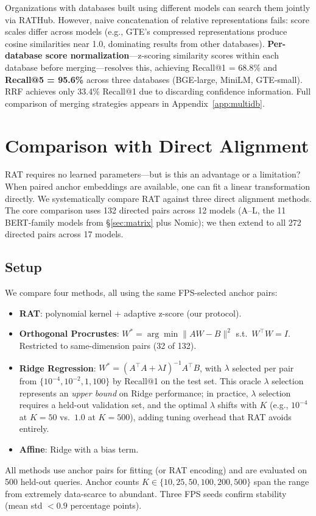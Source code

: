 \documentclass{article}
\begin{document}
Organizations with databases built using different models can search them jointly via RATHub. However, naive concatenation of relative representations fails: score scales differ across models (e.g., GTE's compressed representations produce cosine similarities near 1.0, dominating results from other databases). \textbf{Per-database score normalization}---z-scoring similarity scores within each database before merging---resolves this, achieving Recall@1 = 68.8\% and \textbf{Recall@5 = 95.6\%} across three databases (BGE-large, MiniLM, GTE-small). RRF achieves only 33.4\% Recall@1 due to discarding confidence information. Full comparison of merging strategies appears in Appendix~\ref{app:multidb}.

\section{Comparison with Direct Alignment}
\label{sec:alignment}

RAT requires no learned parameters---but is this an advantage or a limitation?  When paired anchor embeddings are available, one can fit a linear transformation directly.  We systematically compare RAT against three direct alignment methods.  The core comparison uses 132 directed pairs across 12 models (A--L, the 11 BERT-family models from \S\ref{sec:matrix} plus Nomic); we then extend to all 272 directed pairs across 17 models.

\subsection{Setup}

We compare four methods, all using the same FPS-selected anchor pairs:
\begin{itemize}
  \item \textbf{RAT}: polynomial kernel + adaptive z-score (our protocol).
  \item \textbf{Orthogonal Procrustes}: $W^* = \arg\min \|AW - B\|^2$ s.t.\ $W^\top W = I$. Restricted to same-dimension pairs (32 of 132).
  \item \textbf{Ridge Regression}: $W^* = (A^\top A + \lambda I)^{-1} A^\top B$, with $\lambda$ selected per pair from $\{10^{-4}, 10^{-2}, 1, 100\}$ by Recall@1 on the test set.  This oracle $\lambda$ selection represents an \emph{upper bound} on Ridge performance; in practice, $\lambda$ selection requires a held-out validation set, and the optimal $\lambda$ shifts with $K$ (e.g., $10^{-4}$ at $K{=}50$ vs.\ $1.0$ at $K{=}500$), adding tuning overhead that RAT avoids entirely.
  \item \textbf{Affine}: Ridge with a bias term.
\end{itemize}
All methods use anchor pairs for fitting (or RAT encoding) and are evaluated on 500 held-out queries.  Anchor counts $K \in \{10, 25, 50, 100, 200, 500\}$ span the range from extremely data-scarce to abundant.  Three FPS seeds confirm stability (mean std $< 0.9$ percentage points).
\end{document}
